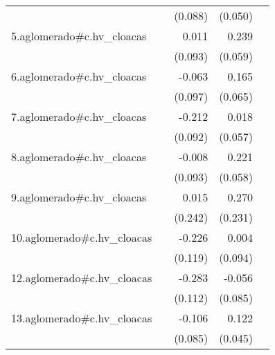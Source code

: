 {\begin{longtable}{l*{4}{D{.}{.}{-1}}}
            &                     &     (0.088)         &     (0.050)         &                     \\
\addlinespace
5.aglomerado#c.hv\_cloacas&                     &       0.011         &       0.239\sym{***}&                     \\
            &                     &     (0.093)         &     (0.059)         &                     \\
\addlinespace
6.aglomerado#c.hv\_cloacas&                     &      -0.063         &       0.165\sym{*}  &                     \\
            &                     &     (0.097)         &     (0.065)         &                     \\
\addlinespace
7.aglomerado#c.hv\_cloacas&                     &      -0.212\sym{*}  &       0.018         &                     \\
            &                     &     (0.092)         &     (0.057)         &                     \\
\addlinespace
8.aglomerado#c.hv\_cloacas&                     &      -0.008         &       0.221\sym{***}&                     \\
            &                     &     (0.093)         &     (0.058)         &                     \\
\addlinespace
9.aglomerado#c.hv\_cloacas&                     &       0.015         &       0.270         &                     \\
            &                     &     (0.242)         &     (0.231)         &                     \\
\addlinespace
10.aglomerado#c.hv\_cloacas&                     &      -0.226         &       0.004         &                     \\
            &                     &     (0.119)         &     (0.094)         &                     \\
\addlinespace
12.aglomerado#c.hv\_cloacas&                     &      -0.283\sym{*}  &      -0.056         &                     \\
            &                     &     (0.112)         &     (0.085)         &                     \\
\addlinespace
13.aglomerado#c.hv\_cloacas&                     &      -0.106         &       0.122\sym{**} &                     \\
            &                     &     (0.085)         &     (0.045)         &                     \\

\end{longtable}}

